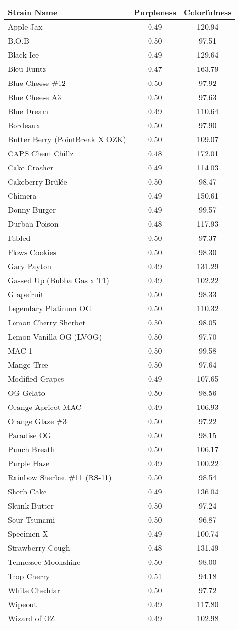 \begin{tabular}{lcc}
\toprule
Strain Name & Purpleness & Colorfulness \\
\midrule
Apple Jax & 0.49 & 120.94 \\
B.O.B. & 0.50 & 97.51 \\
Black Ice & 0.49 & 129.64 \\
Bleu Runtz & 0.47 & 163.79 \\
Blue Cheese \#12 & 0.50 & 97.92 \\
Blue Cheese A3 & 0.50 & 97.63 \\
Blue Dream & 0.49 & 110.64 \\
Bordeaux & 0.50 & 97.90 \\
Butter Berry (PointBreak X OZK) & 0.50 & 109.07 \\
CAPS Chem Chillz & 0.48 & 172.01 \\
Cake Crasher & 0.49 & 114.03 \\
Cakeberry Brûlée & 0.50 & 98.47 \\
Chimera & 0.49 & 150.61 \\
Donny Burger & 0.49 & 99.57 \\
Durban Poison & 0.48 & 117.93 \\
Fabled & 0.50 & 97.37 \\
Flows Cookies & 0.50 & 98.30 \\
Gary Payton & 0.49 & 131.29 \\
Gassed Up (Bubba Gas x T1) & 0.49 & 102.22 \\
Grapefruit & 0.50 & 98.33 \\
Legendary Platinum OG & 0.50 & 110.32 \\
Lemon Cherry Sherbet & 0.50 & 98.05 \\
Lemon Vanilla OG (LVOG) & 0.50 & 97.70 \\
MAC 1 & 0.50 & 99.58 \\
Mango Tree & 0.50 & 97.64 \\
Modified Grapes & 0.49 & 107.65 \\
OG Gelato & 0.50 & 98.56 \\
Orange Apricot MAC & 0.49 & 106.93 \\
Orange Glaze \#3 & 0.50 & 97.22 \\
Paradise OG & 0.50 & 98.15 \\
Punch Breath & 0.50 & 106.17 \\
Purple Haze & 0.49 & 100.22 \\
Rainbow Sherbet \#11 (RS-11) & 0.50 & 98.54 \\
Sherb Cake & 0.49 & 136.04 \\
Skunk Butter & 0.50 & 97.24 \\
Sour Tsunami & 0.50 & 96.87 \\
Specimen X & 0.49 & 100.74 \\
Strawberry Cough & 0.48 & 131.49 \\
Tennessee Moonshine & 0.50 & 98.00 \\
Trop Cherry & 0.51 & 94.18 \\
White Cheddar & 0.50 & 97.72 \\
Wipeout & 0.49 & 117.80 \\
Wizard of OZ & 0.49 & 102.98 \\
\bottomrule
\end{tabular}
